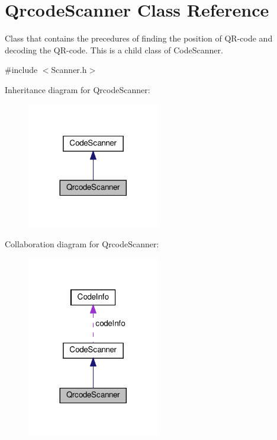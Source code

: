 \hypertarget{classQrcodeScanner}{}\section{Qrcode\+Scanner Class Reference}
\label{classQrcodeScanner}


Class that contains the precedures of finding the position of Q\+R-\/code and decoding the Q\+R-\/code. This is a child class of Code\+Scanner.  




{\ttfamily \#include $<$Scanner.\+h$>$}



Inheritance diagram for Qrcode\+Scanner\+:\nopagebreak
\begin{figure}[H]
\begin{center}
\leavevmode
\includegraphics[width=164pt]{classQrcodeScanner__inherit__graph}
\end{center}
\end{figure}


Collaboration diagram for Qrcode\+Scanner\+:\nopagebreak
\begin{figure}[H]
\begin{center}
\leavevmode
\includegraphics[width=164pt]{classQrcodeScanner__coll__graph}
\end{center}
\end{figure}
